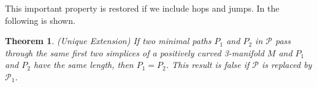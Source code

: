 \documentclass[12pt]{article}
\newtheorem{thm}{Theorem}[section]
\begin{document}
This important property is restored if we include hops and jumps. In \cite{Trout10} the following is shown.

\begin{thm}(Unique Extension) If two minimal paths $P_1$ and $P_2$ in $\mathcal{P}$ pass through the same first two simplices of a positively curved 3-manifold $M$ and $P_1$ and $P_2$ have the same length, then $P_1 = P_2$. This result is false if $\mathcal{P}$ is replaced by $\mathcal{P}_1$.
\end{thm}



\end{document}
